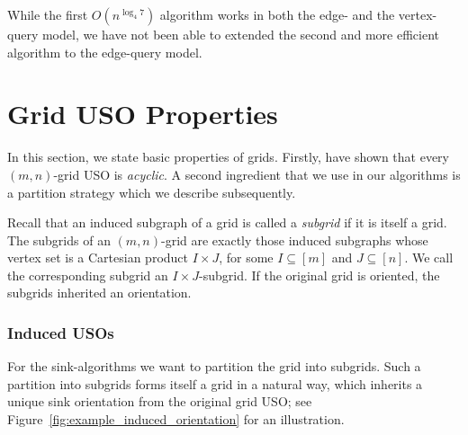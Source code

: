 \documentclass[runningheads,a4paper]{llncs}
\newcommand{\JN}[1]{\marginpar{\parbox{3.6cm}{{\small {\bf JN:} #1}}}} %
\newcommand{\sinkalgs}{sink-algorithms\xspace}
\begin{document}
While the first $O(n^{\log_4 7})$ algorithm works in both the edge- and the vertex-query model, we have not been able to extended the second and more efficient algorithm to the edge-query model.


\section{Grid USO Properties}\label{section:grid_uso_properties}

In this section, we state basic properties of grids. Firstly, \citet{grid08} have shown that every $(m,n)$-grid USO is \emph{acyclic}. 
A second ingredient that we use in our algorithms is a partition strategy which we describe subsequently.

Recall that an induced subgraph of a grid is called a \emph{subgrid} if it is itself a grid.
The subgrids of an $(m,n)$-grid are exactly those induced subgraphs whose vertex set is a
Cartesian product $I \times J$, for some $I \subseteq [m]$ and $J \subseteq [n]$. We call the corresponding subgrid an $I\times J$-subgrid.
If the original grid is oriented, the subgrids inherited an orientation.

\subsubsection{Induced USOs}

For the \sinkalgs we want to partition the grid into subgrids.
Such a partition into subgrids forms itself a grid in a natural way,
which inherits a unique sink orientation from the original grid USO; see Figure~\ref{fig:example_induced_orientation} for an illustration.
\end{document}
